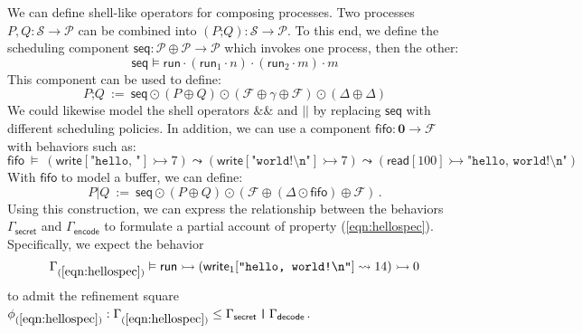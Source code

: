 \documentclass[acmsmall,screen,review,anonymous,nonacm]{acmart}
\newcommand{\kw}[1]{\ensuremath{ \mathsf{#1} }}
\newcommand{\emptysig}{\mathbf0}
\begin{document}
\begin{example}\label{ex:compse-proc} %
We can define shell-like operators for composing processes.
Two processes $P, Q : \mathcal{S} \rightarrow \mathcal{P}$
can be combined into
$(P \mathbin\texttt{;} Q) : \mathcal{S} \rightarrow \mathcal{P}$.
To this end,
we define the scheduling component
$\kw{seq} : \mathcal{P} \oplus \mathcal{P} \rightarrow \mathcal{P}$
which invokes one process, then the other:
\[
  \kw{seq} \vDash
    \kw{run} \cdot (\kw{run}_1 \cdot n) \cdot (\kw{run}_2 \cdot m) \cdot m
\]
This component can be used to define:
\[
  P \mathbin\texttt{;} Q \: := \:
    \kw{seq} \odot (P \oplus Q)
             \odot (\mathcal{F} \oplus \gamma \oplus \mathcal{F})
             \odot (\Delta \oplus \Delta)
\]
We could likewise model the shell operators $\texttt{\&\&}$ and $\texttt{||}$
by replacing $\kw{seq}$ with different scheduling policies.
In addition,
we can use a component
$\kw{fifo} : \emptysig \rightarrow \mathcal{F}$
with behaviors such as:
{\small
\[
  \kw{fifo} \: \vDash \:
    (\kw{write}[\texttt{"hello, "}] \rightarrowtail 7) \leadsto
    (\kw{write}[\texttt{"world!\textbackslash{}n"}] \rightarrowtail 7) \leadsto
    (\kw{read}[100] \rightarrowtail \texttt{"hello, world!\textbackslash{}n"})
\]
}%
With $\kw{fifo}$ to model a buffer,
we can define:
\[
  P \mathbin\texttt{|} Q \: := \:
    \kw{seq} \odot (P \oplus Q)
         \odot (\mathcal{F} \oplus (\Delta \odot \kw{fifo}) \oplus \mathcal{F})
  \,.
\]
Using this construction,
we can express the relationship between the behaviors
$\Gamma_\kw{secret}$ and $\Gamma_\kw{encode}$
to formulate a partial account of property (\ref{eqn:hellospec}).
Specifically,
we expect the behavior
\[
  \Gamma_{(\ref{eqn:hellospec})} \vDash \kw{run}
    \rightarrowtail (\kw{write}_1[\texttt{"hello, world!\textbackslash{}n"}] \leadsto 14)
    \rightarrowtail 0
\]
to admit the refinement square
$
  \phi_{(\ref{eqn:hellospec})} :
  \Gamma_{(\ref{eqn:hellospec})} \le
  \Gamma_\kw{secret} \mathbin{\texttt{|}} \Gamma_\kw{decode}
$.
\end{example}

\end{document}
